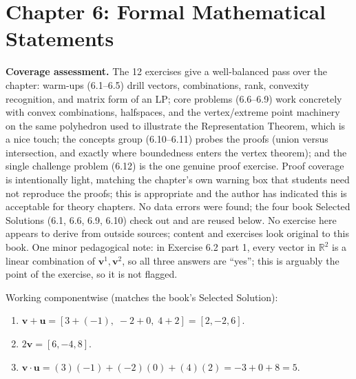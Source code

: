 \section{Chapter 6: Formal Mathematical Statements}

\textbf{Coverage assessment.} The 12 exercises give a well-balanced pass over the chapter: warm-ups (6.1--6.5) drill vectors, combinations, rank, convexity recognition, and matrix form of an LP; core problems (6.6--6.9) work concretely with convex combinations, halfspaces, and the vertex/extreme point machinery on the same polyhedron used to illustrate the Representation Theorem, which is a nice touch; the concepts group (6.10--6.11) probes the proofs (union versus intersection, and exactly where boundedness enters the vertex theorem); and the single challenge problem (6.12) is the one genuine proof exercise. Proof coverage is intentionally light, matching the chapter's own warning box that students need not reproduce the proofs; this is appropriate and the author has indicated this is acceptable for theory chapters. No data errors were found; the four book Selected Solutions (6.1, 6.6, 6.9, 6.10) check out and are reused below. No exercise here appears to derive from outside sources; content and exercises look original to this book. One minor pedagogical note: in Exercise 6.2 part 1, every vector in $\mathbb{R}^2$ is a linear combination of $\mathbf{v}^1, \mathbf{v}^2$, so all three answers are ``yes''; this is arguably the point of the exercise, so it is not flagged.

Working componentwise (matches the book's Selected Solution):
\begin{enumerate}
\item $\mathbf{v} + \mathbf{u} = [3 + (-1),\; -2 + 0,\; 4 + 2] = [2, -2, 6]$.
\item $2\mathbf{v} = [6, -4, 8]$.
\item $\mathbf{v} \cdot \mathbf{u} = (3)(-1) + (-2)(0) + (4)(2) = -3 + 0 + 8 = 5$.
\end{enumerate}

